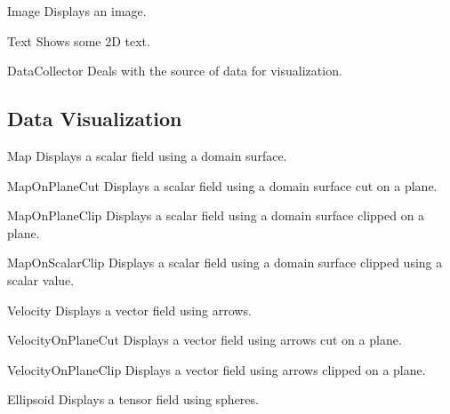 \begin{classdesc}{Image}{}
 Displays an image.
\end{classdesc}

\begin{classdesc}{Text}{}
 Shows some 2D text.
\end{classdesc}

\begin{classdesc}{DataCollector}{}
Deals with the source of data for visualization.
\end{classdesc}

\subsection{Data Visualization}
\begin{classdesc}{Map}{}
 Displays a scalar field using a domain surface.
\end{classdesc}

\begin{classdesc}{MapOnPlaneCut}{}
 Displays a scalar field using a domain surface cut on a plane. 
\end{classdesc}

\begin{classdesc}{MapOnPlaneClip}{}
 Displays a scalar field using a domain surface clipped 
		on a plane.
\end{classdesc}

\begin{classdesc}{MapOnScalarClip}{}
 Displays a scalar field using a domain surface clipped 
		using a scalar value.
\end{classdesc}

\begin{classdesc}{Velocity}{}
 Displays a vector field using arrows.
\end{classdesc}

\begin{classdesc}{VelocityOnPlaneCut}{}
 Displays a vector field using arrows cut on a plane.
\end{classdesc}

\begin{classdesc}{VelocityOnPlaneClip}{}
 Displays a vector field using arrows clipped on a 
		plane.
\end{classdesc}

\begin{classdesc}{Ellipsoid}{}
 Displays a tensor field using spheres.
\end{classdesc}

